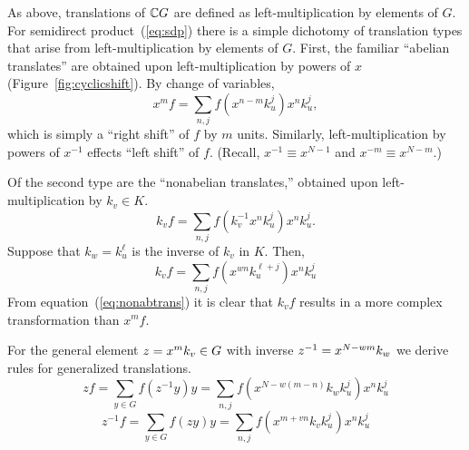As above, translations of $\mathbb{C} G$ are defined as
left-multiplication by elements of $G$.  
For semidirect product~(\ref{eq:sdp}) 
there is a simple dichotomy of translation types that arise
from left-multiplication by elements of $G$.  %
First, the familiar ``abelian translates'' 
are obtained upon left-multiplication by powers of $x$
(Figure~\ref{fig:cyclicshift}).  
By change of variables, 
\begin{equation}
x^mf = \sum_{n,j} f(x^{n-m} k_u^j)x^n k_u^j,
\end{equation}
which is simply a ``right shift'' of $f$ by $m$ units.
Similarly, left-multiplication by powers of
$x^{-1}$ effects ``left shift'' of $f$. 
(Recall, $x^{-1} \equiv x^{N-1}$
and $x^{-m} \equiv x^{N-m}$.)  

Of the second type are the ``nonabelian translates,'' 
obtained upon left-multiplication by $k_v \in K$.
\begin{equation}
  k_vf %
  = \sum_{n,j} f(k_v^{-1}x^n k_u^j)x^n k_u^j.
\end{equation}
Suppose that $k_w = k_u^\ell$ is the inverse of $k_v$ in $K$.  Then,
\begin{equation}
  k_vf %
  = \sum_{n,j} f(x^{wn}k_u^{\ell + j})x^n k_u^j\label{eq:nonabtrans}
\end{equation}
From equation~(\ref{eq:nonabtrans}) it is clear that $k_vf$ 
results in a more complex transformation than $x^m f$.


For the general element $z = x^m k_v \in G$ with 
inverse $z^{-1}=x^{N-wm} k_w$ %
we derive rules for generalized translations.
\begin{equation*}
  zf = \sum_{y\in G} f(z^{-1}y)y= \sum_{n,j} f(x^{N-w(m-n)} k_w k_u^j)x^n k_u^j
\end{equation*}
\begin{equation*}
  z^{-1}f = \sum_{y\in G} f(zy)y= \sum_{n,j} f(x^{m+vn} k_vk_u^j)x^n k_u^j
\end{equation*}

